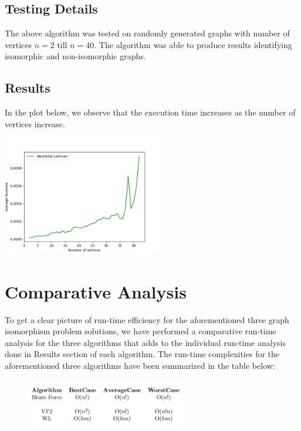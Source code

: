 \documentclass[11pt]{article}
\begin{document}
\subsection{Testing Details}
\label{ssec:fonts}
The above algorithm was tested on randomly generated graphs with number of vertices $n=2$ till $n=40$. The algorithm was able to produce results identifying isomorphic and non-isomorphic graphs. 
\subsection{Results}
In the plot below, we observe that the execution time increases as the number of vertices increase. 
\label{ssec:first}
\begin{center}
\includegraphics[width=7cm]{wl.png}
\end{center}
\section{Comparative Analysis\cite{tolley1995graph}}
\label{sec:length}
To get a clear picture of run-time efficiency for the aforementioned three graph isomorphism problem solutions, we have performed a comparative run-time analysis for the three algorithms that adds to the individual run-time analysis done in Results section of each algorithm. 
The run-time complexities for the aforementioned three algorithms have been summarized in the table below:
 \begin{figure}[H]
     \centering
     \includegraphics[width=7cm]{table.PNG}
 \end{figure}
\end{document}
